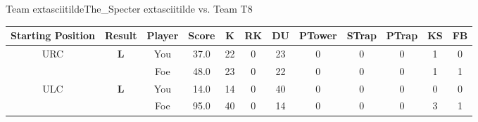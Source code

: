 \documentclass[a4paper,12pt]{article}
\begin{document}
  \vspace*{2em}
  \par {\large {\color{Gray} Team} 	extasciitildeThe\_Specter	extasciitilde {\color{Gray}
      vs. Team} T8}
  \newline
  \begin{tabular}[t]{| c | c | c | c | c | c | c | c | c | c | c | c
      |}
    \hline
    Starting Position & \textbf{Result} & Player & \textbf{Score} & K & RK & DU & PTower & STrap & PTrap & KS & FB \\
    
      
                      
      
                      
      
        \hline
        \multirow{2}{*}{  URC
             } &
              \multirow{2}{*}{  \textbf{L}  } & 
                    \cellcolor{yellow!25} You & \cellcolor{yellow!25} 37.0 & \cellcolor{yellow!25} 22 &
                    \cellcolor{yellow!25} 0 & \cellcolor{yellow!25} 23 & \cellcolor{yellow!25} 0 &
                    \cellcolor{yellow!25} 0 & \cellcolor{yellow!25} 0 & \cellcolor{yellow!25} 1 &
                    \cellcolor{yellow!25} 0 \\
                    \cline{3-12}
                    & & \cellcolor{red!15} Foe & \cellcolor{red!15} 48.0 & \cellcolor{red!15} 23 & \cellcolor{red!15}
                    0 & \cellcolor{red!15} 22
                    & \cellcolor{red!15} 0 & \cellcolor{red!15}
                    0 & \cellcolor{red!15} 0 
                    & \cellcolor{red!15} 1 & \cellcolor{red!15}
                    1 \\
                    
                      
      
                      
      
                      
      
                      
      
        \hline
        \multirow{2}{*}{  ULC  } &
              \multirow{2}{*}{  \textbf{L}  } & 
                    \cellcolor{yellow!25} You & \cellcolor{yellow!25} 14.0 & \cellcolor{yellow!25} 14 &
                    \cellcolor{yellow!25} 0 & \cellcolor{yellow!25} 40 & \cellcolor{yellow!25} 0 &
                    \cellcolor{yellow!25} 0 & \cellcolor{yellow!25} 0 & \cellcolor{yellow!25} 0 &
                    \cellcolor{yellow!25} 0 \\
                    \cline{3-12}
                    & & \cellcolor{red!15} Foe & \cellcolor{red!15} 95.0 & \cellcolor{red!15} 40 & \cellcolor{red!15}
                    0 & \cellcolor{red!15} 14
                    & \cellcolor{red!15} 0 & \cellcolor{red!15}
                    0 & \cellcolor{red!15} 0 
                    & \cellcolor{red!15} 3 & \cellcolor{red!15}
                    1 \\
                    

\end{tabular}
\end{document}

